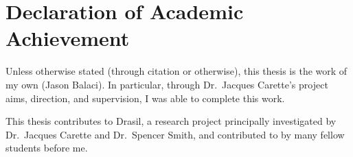 \chapter{Declaration of Academic Achievement}
\label{chap:declaration_of_academic_achievement}

Unless otherwise stated (through citation or otherwise), this thesis is the work
of my own (Jason Balaci). In particular, through Dr.\ Jacques Carette's project
aims, direction, and supervision, I was able to complete this work.

This thesis contributes to Drasil, a research project principally investigated
by Dr.\ Jacques Carette and Dr.\ Spencer Smith, and contributed to by many
fellow students before me.
